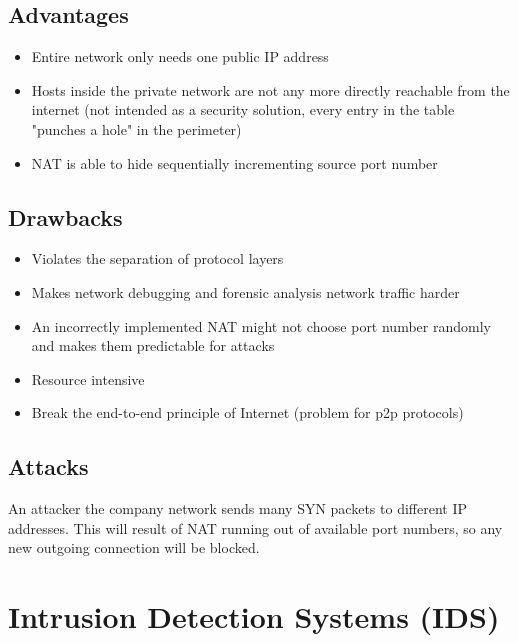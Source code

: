 \begin{minipage}[t]{0.46\textwidth}
    \section{Advantages}
    \begin{itemize}
        \item Entire network only needs one public IP address
        \item Hosts inside the private network are not any more directly reachable from the internet (not intended as a security solution, every entry in the table "punches a hole" in the perimeter)
        \item NAT is able to hide sequentially incrementing source port number
    \end{itemize}
\end{minipage}
\hfill
\begin{minipage}[t]{0.46\textwidth}
    \section{Drawbacks}
    \begin{itemize}
        \item Violates the separation of protocol layers
        \item Makes network debugging and forensic analysis network traffic harder
        \item An incorrectly implemented NAT might not choose port number randomly and makes them predictable for attacks
        \item Resource intensive
        \item Break the end-to-end principle of Internet (problem for p2p protocols)
    \end{itemize}
\end{minipage}

\section{Attacks}

An attacker  the company network sends many SYN packets to different IP addresses. This will result of NAT running out of available port numbers, so any new outgoing connection will be blocked.

\chapter{Intrusion Detection Systems (IDS)}

